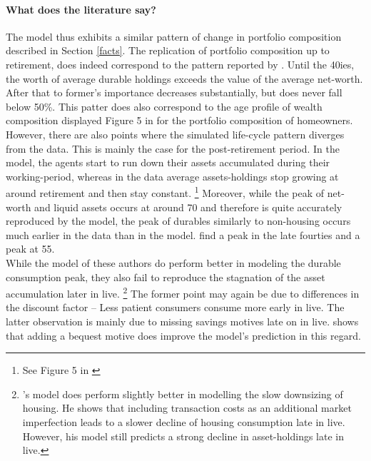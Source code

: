 \documentclass[12pt,a4paper,leqno]{article}
\theoremstyle{definition}
\begin{document}
\paragraph{What does the literature say?} The model thus exhibits a similar pattern of change in portfolio composition described in Section \ref{facts}. The replication of portfolio composition up to retirement, does indeed correspond to the pattern reported by \cite{FV&K2011}. Until the 40ies, the worth of average durable holdings exceeds the value of the average net-worth. After that to former's importance decreases substantially, but does never fall below 50\%. This patter does also correspond to the age profile of wealth composition displayed Figure 5 in \cite{yang2009} for the portfolio composition of homeowners. \\ However, there are also points where the simulated life-cycle pattern diverges from the data. This is mainly the case for the post-retirement period. In the model, the agents start to run down their assets accumulated during their working-period, whereas in the data average assets-holdings stop growing at around retirement and then stay constant. \footnote{See Figure 5 in \cite{yang2009}} Moreover, while the peak of net-worth and liquid assets occurs at around 70 and therefore is quite accurately reproduced by the model, the peak of durables similarly to non-housing occurs much earlier in the data than in the model. \citep{FV&K2011} find a peak in the late fourties and \citep{yang2009} a peak at 55. \\
While the model of these authors do perform better in modeling the durable consumption peak, they also fail to reproduce the stagnation of the asset accumulation later in live. \footnote{\cite{yang2009}'s model does perform slightly better in modelling the slow downsizing of housing. He shows that including transaction costs as an additional market imperfection leads to a slower decline of housing consumption late in live. However, his model still predicts a strong decline in asset-holdings late in live.} The former point may again be due to differences in the discount factor \--- Less patient consumers consume more early in live. The latter observation is mainly due to missing savings motives late on in live. \cite{de2004wealth} shows that adding a bequest motive does improve the model's prediction in this regard. 
\end{document}
